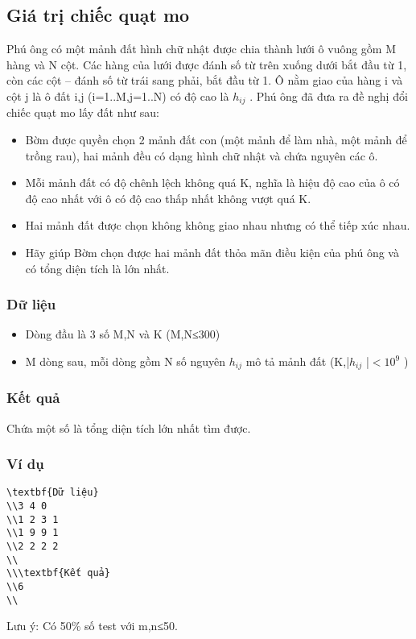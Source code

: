 







\subsection{   Giá trị chiếc quạt mo  }

   Phú ông có một mảnh đất hình chữ nhật được chia thành lưới ô vuông gồm M hàng và N cột. Các hàng của lưới được đánh số từ trên xuống dưới bắt đầu từ 1, còn các cột – đánh số từ trái sang phải, bắt đầu từ 1. Ô nằm giao của hàng i và cột j là ô đất i,j (i=1..M,j=1..N) có độ cao là $h_{ij}$   . Phú ông đã đưa ra đề nghị đổi chiếc quạt mo lấy đất như sau:  
\begin{itemize}
	\item     Bờm được quyền chọn 2 mảnh đất con (một mảnh để làm nhà, một mảnh để trồng rau), hai mảnh đều có dạng hình chữ nhật và chứa nguyên các ô.   
	\item     Mỗi mảnh đất có độ chênh lệch không quá K, nghĩa là hiệu độ cao của ô có độ cao nhất với ô có độ cao thấp nhất không vượt quá K.   
	\item     Hai mảnh đất được chọn không không giao nhau nhưng có thể tiếp xúc nhau.   
	\item     Hãy giúp Bờm chọn được hai mảnh đất thỏa mãn điều kiện của phú ông và có tổng diện tích là lớn nhất.   
\end{itemize}

\subsubsection{   Dữ liệu  }
\begin{itemize}
	\item     Dòng đầu là 3 số M,N và  K (M,N≤300)   
	\item     M dòng sau, mỗi dòng gồm N số nguyên $h_{ij}$    mô tả mảnh đất (K,|$h_{ij}$    |$<$$10^{9}$    )   
\end{itemize}

\subsubsection{   Kết quả  }

   Chứa một số là tổng diện tích lớn nhất tìm được.  

\subsubsection{   Ví dụ  }
\begin{verbatim}
\textbf{Dữ liệu}
\\3 4 0
\\1 2 3 1
\\1 9 9 1
\\2 2 2 2	
\\
\\\textbf{Kết quả}
\\6
\\\end{verbatim}

   Lưu ý: Có 50\% số test với m,n≤50.  

